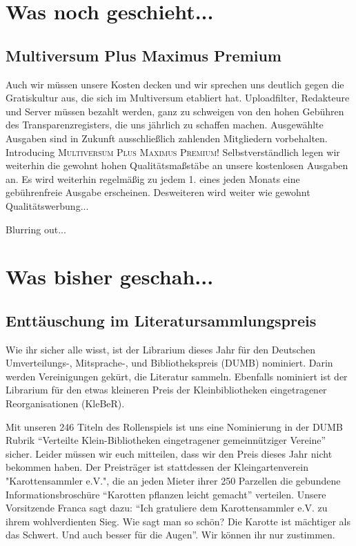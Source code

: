 \documentclass[final]{multiversum}
\begin{document}
\makemultititle
%


\section{Was noch geschieht...}

\subsection{Multiversum Plus Maximus Premium}
Auch wir müssen unsere Kosten decken und wir sprechen uns deutlich gegen die Gratiskultur aus, die sich im Multiversum etabliert hat. 
Uploadfilter, Redakteure und Server müssen bezahlt werden, ganz zu schweigen von den hohen Gebühren des Transparenzregisters, die uns jährlich zu schaffen machen.
Ausgewählte Ausgaben sind in Zukunft ausschließlich zahlenden Mitgliedern vorbehalten.
Introducing \textsc{Multiversum Plus Maximus Premium!}
Selbstverständlich legen wir weiterhin die gewohnt hohen Qualitätsmaßstäbe an unsere kostenlosen Ausgaben an.
Es wird weiterhin regelmäßig zu jedem 1. eines jeden Monats eine gebührenfreie Ausgabe erscheinen.
Desweiteren wird weiter wie gewohnt Qualitätswerbung...

Blurring out...

\section{Was bisher geschah...}

\subsection{Enttäuschung im Literatursammlungspreis}
Wie ihr sicher alle wisst, ist der Librarium dieses Jahr für den Deutschen Umverteilungs-, Mitsprache-, und Bibliothekspreis (DUMB) nominiert.
Darin werden Vereinigungen gekürt, die Literatur sammeln.
Ebenfalls nominiert ist der Librarium für den etwas kleineren Preis der Kleinbibliotheken eingetragener Reorganisationen (KleBeR).

Mit unseren 246 Titeln des Rollenspiels ist uns eine Nominierung in der DUMB Rubrik \enquote{Verteilte Klein-Bibliotheken eingetragener gemeinnütziger Vereine} sicher.
Leider müssen wir euch mitteilen, dass wir den Preis dieses Jahr nicht bekommen haben.
Der Preisträger ist stattdessen der Kleingartenverein "Karottensammler e.V.", die an jeden Mieter ihrer 250 Parzellen die gebundene Informationsbroschüre \enquote{Karotten pflanzen leicht gemacht} verteilen.
Unsere Vorsitzende Franca sagt dazu: \enquote{Ich gratuliere dem Karottensammler e.V. zu ihrem wohlverdienten Sieg. 
Wie sagt man so schön? Die Karotte ist mächtiger als das Schwert. Und auch besser für die Augen}.
Wir können ihr nur zustimmen.
\end{document}
